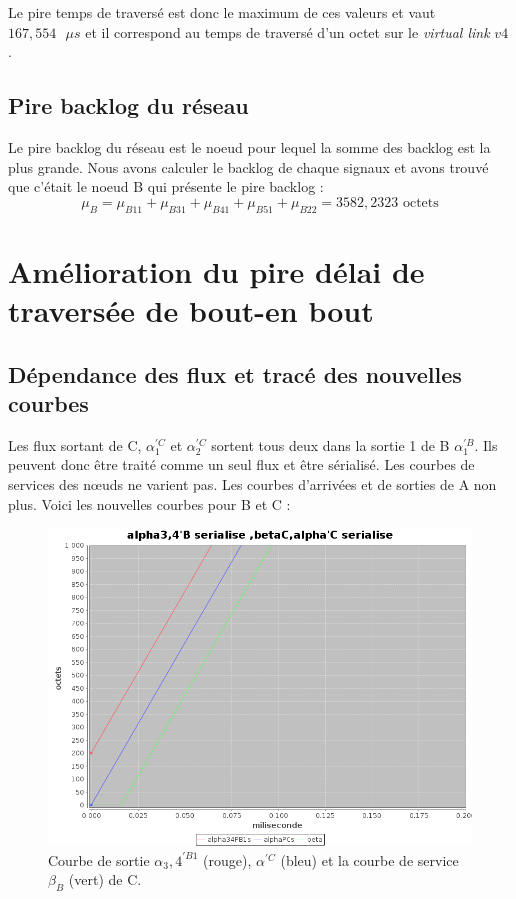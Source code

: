 Le pire temps de traversé est donc le maximum de ces valeurs et vaut $167,554 \text{ }\mu s$ et il correspond au temps de traversé d'un octet sur le \emph{virtual link} $v4$.
\subsection{Pire backlog du réseau}
Le pire backlog du réseau est le noeud pour lequel la somme des backlog est la plus grande.
Nous avons calculer le backlog de chaque signaux et avons trouvé que c'était le noeud B qui présente le pire backlog : 
\begin{equation}
\mu_B = \mu_{B11} + \mu_{B31} + \mu_{B41} + \mu_{B51} + \mu_{B22}  = 3582,2323 \text{ octets}
\end{equation}
\section{Amélioration du pire délai de traversée de bout-en bout}
\subsection{Dépendance des flux et tracé des nouvelles courbes}
Les flux sortant de C, $\alpha_1^{'C}$ et $\alpha_2^{'C}$ sortent tous deux dans la sortie 1 de B $\alpha_1^{'B}$. Ils peuvent donc être traité comme un seul flux et être sérialisé.
Les courbes de services des n\oe uds ne varient pas. Les courbes d'arrivées et de sorties de A non plus.
Voici les nouvelles courbes pour B et C :
\begin{figure}[!ht]%
\centering%
\noindent\includegraphics[width = .6\textwidth]{./II/images/alphaSerialise.png}%
\caption{\label{fig:alphaSerialise}Courbe de sortie $\alpha_3,4^{'B1}$ (rouge), $\alpha^{'C}$ (bleu) et la courbe de service $\beta_B$ (vert) de C.}%
\end{figure}

